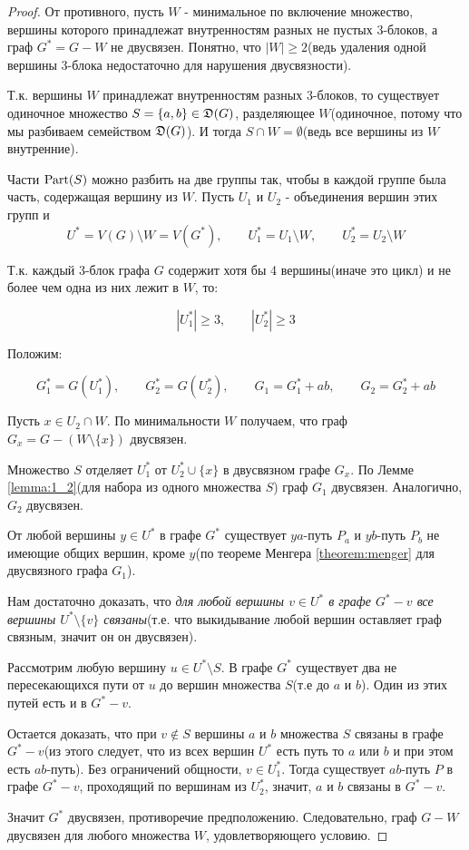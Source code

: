 \begin{proof}
	От противного, пусть $W$ - минимальное по включение множество, вершины которого принадлежат внутренностям разных не пустых 3-блоков, а граф  $G^* = G - W$ не двусвязен.
	Понятно, что  $|W| \geqslant 2$(ведь удаления одной вершины 3-блока недостаточно для нарушения двусвязности).

	Т.к. вершины  $W$ принадлежат внутренностям разных  $3$-блоков, то существует одиночное множество  $S = \{a, b\} \in \mathfrak{D}(G)$, разделяющее  $W$(одиночное, потому что мы разбиваем семейством $\mathfrak{D}(G)$).
	И тогда $S \cap W = \emptyset$(ведь все вершины из $W$ внутренние).
 
	Части $\operatorname{Part}(S)$ можно разбить на две группы так, чтобы в каждой группе была часть, содержащая вершину из  $W$.
	Пусть  $U_1$ и  $U_2$ - объединения вершин этих групп и 
	\[
		U^* = V(G) \setminus W = V(G^*), \qquad U_1^* = U_1 \setminus W, \qquad U^*_2 = U_2 \setminus W
	\]

	Т.к. каждый 3-блок графа $G$ содержит хотя бы 4 вершины(иначе это цикл) и не более чем одна из них лежит в  $W$, то:

	\[
		|U_1^*| \geqslant 3, \qquad |U_2^*| \geqslant 3
	\] 

	Положим:

	\[
		G_1^* = G(U_1^*), \qquad G_2^* = G(U_2^*), \qquad G_1 = G_1^* + ab, \qquad G_2 = G_2^* + ab
	\] 

	Пусть $x \in U_2 \cap W$.
	По минимальности $W$ получаем, что граф  $G_x = G - (W \setminus \{x\})$ двусвязен.

	Множество $S$ отделяет  $U_1^*$ от  $U_2^* \cup \{x \}$ в двусвязном графе $G_x$.
	По Лемме \ref{lemma:1_2}(для набора из одного множества $S$) граф $G_1$ двусвязен.
	Аналогично,  $G_2$ двусвязен.

	От любой вершины  $y \in U^*$ в графе  $G^*$ существует  $ya$-путь  $P_a$ и  $yb$-путь  $P_b$ не имеющие общих вершин, кроме  $y$(по теореме Менгера \ref{theorem:menger} для двусвязного графа  $G_1$). 

	Нам достаточно доказать, что \textit{для любой вершины $v \in U^*$ в графе  $G^* - v$ все вершины  $U^* \setminus \{v\}$ связаны}(т.е. что выкидывание любой вершин оставляет граф связным, значит он он двусвязен).

	Рассмотрим любую вершину $u \in U^* \setminus S$.
	В графе  $G^*$ существует два не пересекающихся пути от  $u$ до вершин множества  $S$(т.е до $a$ и  $b$).
	Один из этих путей есть и в  $G^* - v$.

	Остается доказать, что при  $v \not \in S$ вершины  $a$ и  $b$ множества  $S$ связаны в графе  $G^* - v$(из этого следует, что из всех вершин $U^*$ есть путь то $a$ или $b$ и при этом есть  $ab$-путь).
	Без ограничений общности, $v \in U_1^*$.
	Тогда существует $ab$-путь $P$ в графе $G^* - v$, проходящий по вершинам из $U_2^*$, значит, $a$ и $b$ связаны в  $G^* - v$.

	Значит $G^*$ двусвязен, противоречие предположению.
	Следовательно, граф $G - W$ двусвязен для любого множества $W$, удовлетворяющего условию.
\end{proof}



